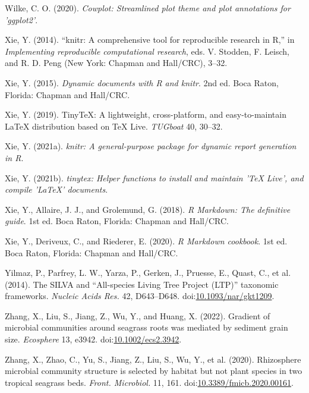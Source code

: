 \documentclass[12pt,]{article}
\begin{document}
\leavevmode\hypertarget{ref-Wilke2020}{}%
Wilke, C. O. (2020). \emph{Cowplot: Streamlined plot theme and plot
annotations for 'ggplot2'}.

\leavevmode\hypertarget{ref-Xie2014}{}%
Xie, Y. (2014). ``knitr: A comprehensive tool for reproducible research
in R,'' in \emph{Implementing reproducible computational research}, eds.
V. Stodden, F. Leisch, and R. D. Peng (New York: Chapman and Hall/CRC),
3--32.

\leavevmode\hypertarget{ref-Xie2015}{}%
Xie, Y. (2015). \emph{Dynamic documents with R and knitr}. 2nd ed. Boca
Raton, Florida: Chapman and Hall/CRC.

\leavevmode\hypertarget{ref-Xie2019}{}%
Xie, Y. (2019). TinyTeX: A lightweight, cross-platform, and
easy-to-maintain LaTeX distribution based on TeX Live. \emph{TUGboat}
40, 30--32.

\leavevmode\hypertarget{ref-Xie2021}{}%
Xie, Y. (2021a). \emph{knitr: A general-purpose package for dynamic
report generation in R}.

\leavevmode\hypertarget{ref-Xie2021a}{}%
Xie, Y. (2021b). \emph{tinytex: Helper functions to install and maintain
'TeX Live', and compile 'LaTeX' documents}.

\leavevmode\hypertarget{ref-Xie2018}{}%
Xie, Y., Allaire, J. J., and Grolemund, G. (2018). \emph{R Markdown: The
definitive guide}. 1st ed. Boca Raton, Florida: Chapman and Hall/CRC.

\leavevmode\hypertarget{ref-Xie2020}{}%
Xie, Y., Deriveux, C., and Riederer, E. (2020). \emph{R Markdown
cookbook}. 1st ed. Boca Raton, Florida: Chapman and Hall/CRC.

\leavevmode\hypertarget{ref-Yilmaz2014a}{}%
Yilmaz, P., Parfrey, L. W., Yarza, P., Gerken, J., Pruesse, E., Quast,
C., et al. (2014). The SILVA and ``All-species Living Tree Project
(LTP)'' taxonomic frameworks. \emph{Nucleic Acids Res.} 42, D643--D648.
doi:\href{https://doi.org/10.1093/nar/gkt1209}{10.1093/nar/gkt1209}.

\leavevmode\hypertarget{ref-Zhang2022}{}%
Zhang, X., Liu, S., Jiang, Z., Wu, Y., and Huang, X. (2022). Gradient of
microbial communities around seagrass roots was mediated by sediment
grain size. \emph{Ecosphere} 13, e3942.
doi:\href{https://doi.org/10.1002/ecs2.3942}{10.1002/ecs2.3942}.

\leavevmode\hypertarget{ref-Zhang2020}{}%
Zhang, X., Zhao, C., Yu, S., Jiang, Z., Liu, S., Wu, Y., et al. (2020).
Rhizosphere microbial community structure is selected by habitat but not
plant species in two tropical seagrass beds. \emph{Front. Microbiol.}
11, 161.
doi:\href{https://doi.org/10.3389/fmicb.2020.00161}{10.3389/fmicb.2020.00161}.
\end{document}
